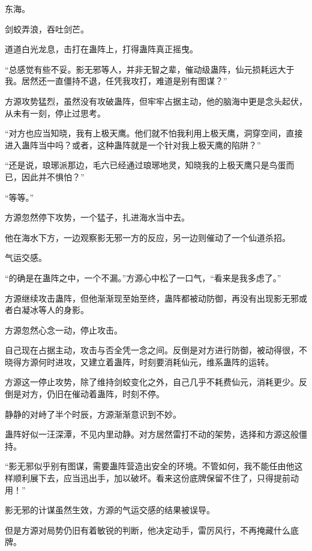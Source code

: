 
\begin{this_body}



东海。

剑蛟弄浪，吞吐剑芒。

道道白光龙息，击打在蛊阵上，打得蛊阵真正摇曳。

“总感觉有些不妥。影无邪等人，并非无智之辈，催动级蛊阵，仙元损耗远大于我。居然还一直僵持不退，任凭我攻打，难道是别有图谋？”

方源攻势猛烈，虽然没有攻破蛊阵，但牢牢占据主动，他的脑海中更是念头起伏，从未有一刻，停止过思考。

“对方也应当知晓，我有上极天鹰。他们就不怕我利用上极天鹰，洞穿空间，直接进入蛊阵当中吗？或者，这种蛊阵就是一个针对我上极天鹰的陷阱？”

“还是说，琅琊派那边，毛六已经通过琅琊地灵，知晓我的上极天鹰只是鸟蛋而已，因此并不惧怕？”

“等等。”

方源忽然停下攻势，一个猛子，扎进海水当中去。

他在海水下方，一边观察影无邪一方的反应，另一边则催动了一个仙道杀招。

气运交感。

“的确是在蛊阵之中，一个不漏。”方源心中松了一口气，“看来是我多虑了。”

方源继续攻击蛊阵，但他渐渐现至始至终，蛊阵都被动防御，再没有出现影无邪或者白凝冰等人的身影。

方源忽然心念一动，停止攻击。

自己现在占据主动，攻击与否全凭一念之间。反倒是对方进行防御，被动得很，不晓得方源何时进攻，又建立着蛊阵，时刻要消耗仙元，维系蛊阵的运转。

方源这一停止攻势，除了维持剑蛟变化之外，自己几乎不耗费仙元，消耗更少。反倒是对方，仍旧在催动着蛊阵，时刻不停。

静静的对峙了半个时辰，方源渐渐意识到不妙。

蛊阵好似一汪深潭，不见内里动静。对方居然雷打不动的架势，选择和方源这般僵持。

“影无邪似乎别有图谋，需要蛊阵营造出安全的环境。不管如何，我不能任由他这样顺利展下去，应当迅出手，加以破坏。看来这份底牌保留不住了，只得提前动用！”

影无邪的计谋虽然生效，方源的气运交感的结果被误导。

但是方源对局势仍旧有着敏锐的判断，他决定动手，雷厉风行，不再掩藏什么底牌。


\end{this_body}
